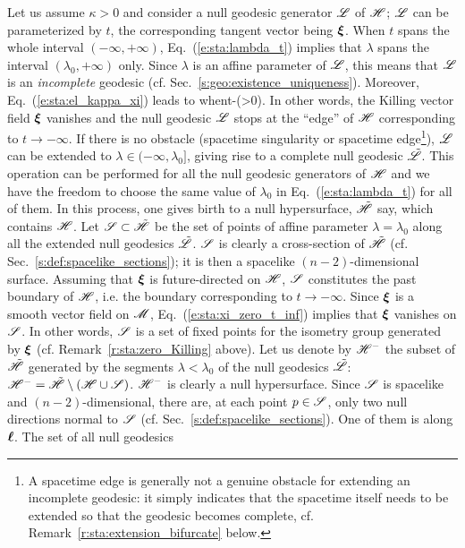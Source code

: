 Let us assume $\kappa>0$ and consider a
null geodesic generator $\mathscr{L}$ of $\mathscr{H}$; $\mathscr{L}$ can be parameterized by $t$, the corresponding
tangent vector being $\bm{\xi}$. When $t$ spans the whole interval $(-\infty,+\infty)$,
Eq.~(\ref{e:sta:lambda_t}) implies that $\lambda$ spans the
interval $(\lambda_0,+\infty)$ only. Since $\lambda$ is an affine parameter of $\mathscr{L}$,
this means that $\mathscr{L}$ is an \emph{incomplete} geodesic (cf. Sec.~\ref{s:geo:existence_uniqueness}).
Moreover, Eq.~(\ref{e:sta:el_kappa_xi}) leads to
\be \label{e:sta:xi_zero_t_inf}
    \w{\xi}  \quad\mbox{when}\quad t\rightarrow -\infty \qquad (\kappa>0).
\ee
In other words, the Killing vector field $\bm{\xi}$ vanishes and
the null geodesic $\mathscr{L}$ stops at the ``edge'' of $\mathscr{H}$ corresponding to
$t\rightarrow -\infty$.
If there is no obstacle (spacetime singularity or spacetime edge\footnote{A spacetime edge is generally not a genuine obstacle for extending an incomplete geodesic: it simply indicates
that the spacetime itself needs to be extended so that the geodesic becomes complete,
cf. Remark~\ref{r:sta:extension_bifurcate} below.}),
$\mathscr{L}$ can be
extended to $\lambda\in(-\infty,\lambda_0]$, giving rise to a complete
null geodesic $\tilde{\mathscr{L}}$. This operation can be performed for all the
null geodesic generators of $\mathscr{H}$ and we have the freedom to choose the same value
of $\lambda_0$ in Eq.~(\ref{e:sta:lambda_t}) for all of them. In this process,
one gives birth to a null hypersurface, $\tilde{\mathscr{H}}$ say, which contains $\mathscr{H}$. Let $\mathscr{S}\subset\tilde{\mathscr{H}}$ be the set of points of
affine parameter $\lambda=\lambda_0$ along all the extended null geodesics
$\tilde{\mathscr{L}}$. $\mathscr{S}$ is clearly a cross-section of $\tilde{\mathscr{H}}$
(cf. Sec.~\ref{s:def:spacelike_sections}); it is then a
spacelike $(n-2)$-dimensional surface.
Assuming that $\bm{\xi}$ is future-directed on $\mathscr{H}$,
$\mathscr{S}$ constitutes the past boundary of $\mathscr{H}$, i.e. the boundary corresponding to $t\rightarrow -\infty$.
Since $\bm{\xi}$ is a smooth vector field on $\mathscr{M}$, Eq.~(\ref{e:sta:xi_zero_t_inf})
implies that $\bm{\xi}$ vanishes on $\mathscr{S}$.
In other words, $\mathscr{S}$ is a set of fixed points for the isometry group generated
by $\bm{\xi}$ (cf. Remark~\ref{r:sta:zero_Killing} above).
Let us denote by $\mathscr{H}^-$ the subset of $\tilde{\mathscr{H}}$
generated by the segments $\lambda<\lambda_0$ of the null geodesics $\tilde{\mathscr{L}}$:
$\mathscr{H}^- = \tilde{\mathscr{H}}\setminus(\mathscr{H}\cup\mathscr{S})$.
$\mathscr{H}^-$ is clearly a null hypersurface.
Since $\mathscr{S}$ is spacelike and $(n-2)$-dimensional, there are, at each point
$p\in\mathscr{S}$, only two null directions normal to $\mathscr{S}$ (cf. Sec.~\ref{s:def:spacelike_sections}). One of them is along $\bm{\ell}$. The set of all null geodesics
